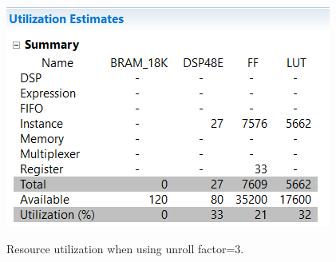 \begin{figure}[H]
	\centering
	{\includegraphics[width=\textwidth]{Images/resource_utilization_factor3.png}}\\[0.5cm]
	\caption{Resource utilization when using unroll factor=3.}
	\label{fig:resource_utilization}
\end{figure}